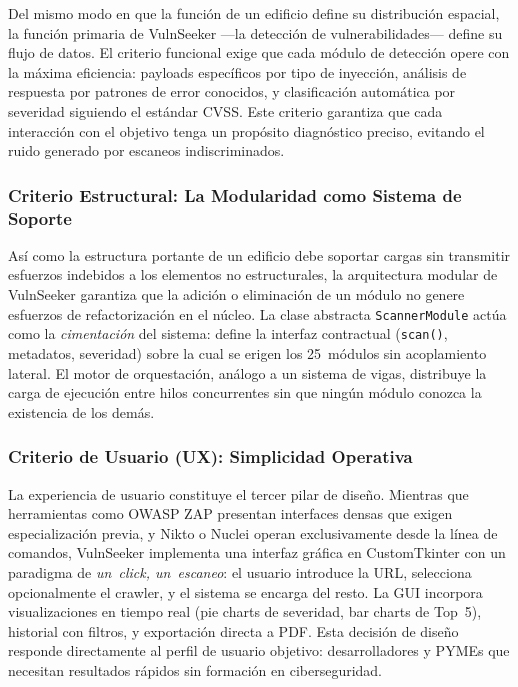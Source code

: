 \documentclass[12pt, a4paper]{article}
\begin{document}
Del mismo modo en que la función de un edificio define su distribución espacial,
la función primaria de VulnSeeker ---la detección de vulnerabilidades--- define
su flujo de datos. El criterio funcional exige que cada módulo de detección
opere con la máxima eficiencia: payloads específicos por tipo de inyección,
análisis de respuesta por patrones de error conocidos, y clasificación automática
por severidad siguiendo el estándar CVSS. Este criterio ga\-ran\-ti\-za que cada
interacción con el objetivo tenga un propósito diagnóstico preciso, evitando el
ruido generado por escaneos indiscriminados.

\subsubsection{Criterio Estructural: La Modularidad como Sistema de Soporte}

Así como la estructura portante de un edificio debe soportar cargas sin
transmitir esfuerzos indebidos a los elementos no estructurales, la arquitectura
modular de VulnSeeker garantiza que la adición o eliminación de un módulo no
genere esfuerzos de refactorización en el núcleo. La clase abstracta
\texttt{ScannerModule} actúa como la \textit{cimentación} del sistema: define
la interfaz contractual (\texttt{scan()}, metadatos, severidad) sobre la cual
se erigen los 25~módulos sin acoplamiento lateral. El motor de orquestación,
análogo a un sistema de vigas, distribuye la carga de ejecución entre hilos
concurrentes sin que ningún módulo conozca la existencia de los demás.

\subsubsection{Criterio de Usuario (UX): Simplicidad Operativa}

La experiencia de usuario constituye el tercer pilar de diseño. Mientras que
herramientas como OWASP ZAP presentan interfaces densas que exigen
especialización previa, y Nikto o Nuclei operan exclusivamente desde la línea
de comandos, VulnSeeker implementa una interfaz gráfica en CustomTkinter con
un paradigma de \textit{un~click, un~escaneo}: el usuario introduce la URL,
selecciona opcionalmente el crawler, y el sistema se encarga del resto. La GUI
incorpora visualizaciones en tiempo real (pie charts de severidad, bar charts
de Top~5), historial con filtros, y exportación directa a PDF. Esta decisión de
diseño responde directamente al perfil de usuario objetivo: desarrolladores y
PYMEs que necesitan resultados rápidos sin formación en ciberseguridad.
\end{document}
